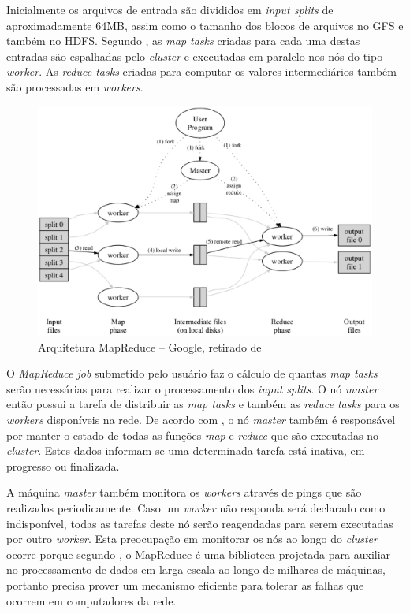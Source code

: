 Inicialmente os arquivos de entrada são divididos em \textit{input splits} de aproximadamente 64MB, assim como o tamanho dos blocos de arquivos no GFS e também no HDFS. Segundo , as \textit{map tasks} criadas para cada uma destas entradas são espalhadas pelo \textit{cluster} e executadas em paralelo nos nós do tipo \textit{worker}. As \textit{reduce tasks} criadas para computar os valores intermediários também são processadas em \textit{workers}.

\begin{figure}[ht!]
	\centering
	\includegraphics[keepaspectratio=true,scale=0.5]
	  {figuras/mapreduce-google.eps}
	\caption{Arquitetura MapReduce – Google, retirado de \cite{ghemawatMapreduce2008}}
	\label{fig-mapreduce-google}
\end{figure}

O \textit{MapReduce job} submetido pelo usuário faz o cálculo de quantas \textit{map tasks} serão necessárias para realizar o processamento dos \textit{input splits}. O nó \textit{master} então possui a tarefa de distribuir as \textit{map tasks} e também as \textit{reduce tasks} para os \textit{workers} disponíveis na rede. De acordo com , o nó \textit{master} também é responsável por manter o estado de todas as funções \textit{map} e \textit{reduce} que são executadas no \textit{cluster}. Estes dados informam se uma determinada tarefa está inativa, em progresso ou finalizada. 

A máquina \textit{master} também monitora os \textit{workers} através de pings que são realizados periodicamente. Caso um \textit{worker} não responda será declarado como indisponível, todas as tarefas deste nó serão reagendadas para serem executadas por outro \textit{worker}. Esta preocupação em monitorar os nós ao longo do \textit{cluster} ocorre porque segundo , o MapReduce é uma biblioteca projetada para auxiliar no processamento de dados em larga escala ao longo de milhares de máquinas, portanto precisa prover um mecanismo eficiente para tolerar as falhas que ocorrem em computadores da rede.

